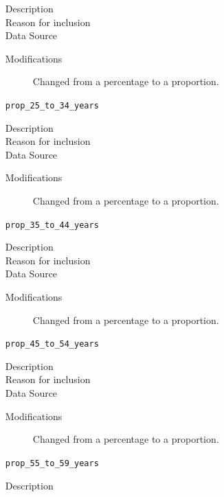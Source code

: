 \documentclass{article}
\begin{document}
\begin{itemize}[label={}, align=left]
\begin{description}
              \item[Description] 
              \item[Reason for inclusion] \agereason
              \item[Data Source] \cite{acs_demographics_data}
              \item[Modifications] Changed from a percentage to a proportion.
          \end{description}
    \item[\texttt{prop\_25\_to\_34\_years}] \
          \begin{description}
              \item[Description] 
              \item[Reason for inclusion] \agereason
              \item[Data Source] \cite{acs_demographics_data}
              \item[Modifications] Changed from a percentage to a proportion.
          \end{description}
    \item[\texttt{prop\_35\_to\_44\_years}] \
          \begin{description}
              \item[Description] 
              \item[Reason for inclusion] \agereason
              \item[Data Source] \cite{acs_demographics_data}
              \item[Modifications] Changed from a percentage to a proportion.
          \end{description}
    \item[\texttt{prop\_45\_to\_54\_years}] \
          \begin{description}
              \item[Description] 
              \item[Reason for inclusion] \agereason
              \item[Data Source] \cite{acs_demographics_data}
              \item[Modifications] Changed from a percentage to a proportion.
          \end{description}
    \item[\texttt{prop\_55\_to\_59\_years}] \
          \begin{description}
              \item[Description] \agedescto{55}{59}

\end{description}
\end{itemize}
\end{document}
